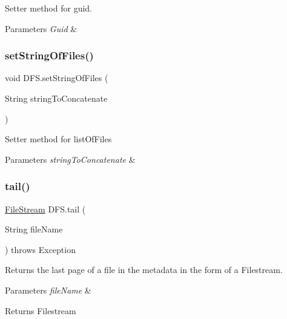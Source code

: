 Setter method for guid. 
\begin{DoxyParams}{Parameters}
{\em Guid} & \\
\hline
\end{DoxyParams}
\mbox{\label{class_d_f_s_a0b41c089ddb9531824556a982e3548eb}} 
\subsubsection{\texorpdfstring{set\+String\+Of\+Files()}{setStringOfFiles()}}
{\footnotesize\ttfamily void D\+F\+S.\+set\+String\+Of\+Files (\begin{DoxyParamCaption}\item[{String}]{string\+To\+Concatenate }\end{DoxyParamCaption})\hspace{0.3cm}{\ttfamily [inline]}}

Setter method for list\+Of\+Files 
\begin{DoxyParams}{Parameters}
{\em string\+To\+Concatenate} & \\
\hline
\end{DoxyParams}
\mbox{\label{class_d_f_s_a86ed64f3b14dc0c0d878dbcb1ca1cfa9}} 
\subsubsection{\texorpdfstring{tail()}{tail()}}
{\footnotesize\ttfamily \mbox{\hyperlink{class_file_stream}{File\+Stream}} D\+F\+S.\+tail (\begin{DoxyParamCaption}\item[{String}]{file\+Name }\end{DoxyParamCaption}) throws Exception\hspace{0.3cm}{\ttfamily [inline]}}

Returns the last page of a file in the metadata in the form of a Filestream. 
\begin{DoxyParams}{Parameters}
{\em file\+Name} & \\
\hline
\end{DoxyParams}
\begin{DoxyReturn}{Returns}
Filestream 
\end{DoxyReturn}

